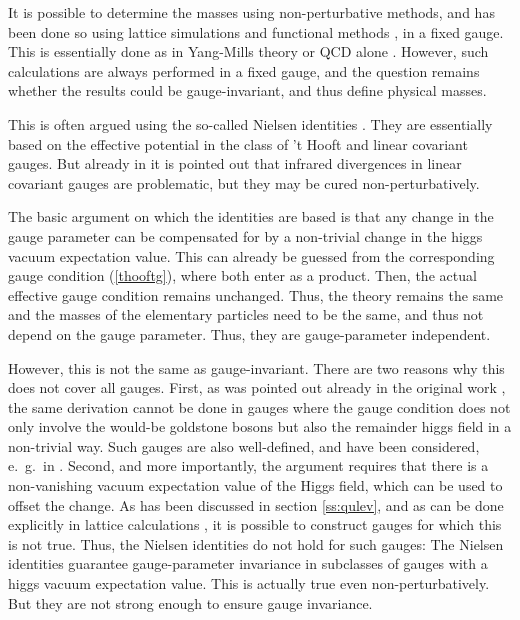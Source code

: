 \documentclass[final,12pt]{article}
\newcommand*{\pref}[1]{(\ref{#1})}
\newcommand*{\1}{1\!\!\!\bot}
\begin{document}
It is possible to determine the masses using non-perturbative methods, and has been done so using lattice simulations \cite{Karsch:1996aw,Maas:2010nc,Maas:2012tj,Maas:2013aia,Maas:2016edk,Maas:2016ngo,Maas:2018sqz} and functional methods \cite{Benes:2008ir,Fister:2010yw}, in a fixed gauge. This is essentially done as in Yang-Mills theory or QCD alone \cite{Maas:2011se}. However, such calculations are always performed in a fixed gauge, and the question remains whether the results could be gauge-invariant, and thus define physical masses.

This is often argued using the so-called Nielsen identities \cite{Nielsen:1975fs}. They are essentially based on the effective potential in the class of 't Hooft and linear covariant gauges. But already in \cite{Nielsen:1975fs} it is pointed out that infrared divergences in linear covariant gauges are problematic, but they may be cured non-perturbatively.

The basic argument on which the identities are based is that any change in the gauge parameter can be compensated for by a non-trivial change in the higgs vacuum expectation value. This can already be guessed from the corresponding gauge condition \pref{thooftg}, where both enter as a product. Then, the actual effective gauge condition remains unchanged. Thus, the theory remains the same and the masses of the elementary particles need to be the same, and thus not depend on the gauge parameter. Thus, they are gauge-parameter independent. 

However, this is not the same as gauge-invariant. There are two reasons why this does not cover all gauges. First, as was pointed out already in the original work \cite{Nielsen:1975fs}, the same derivation cannot be done in gauges where the gauge condition does not only involve the would-be goldstone bosons but also the remainder higgs field in a non-trivial way. Such gauges are also well-defined, and have been considered, e.\ g.\ in \cite{Dolan:1974gu}. Second, and more importantly, the argument requires that there is a non-vanishing vacuum expectation value of the Higgs field, which can be used to offset the change. As has been discussed in section \ref{ss:qulev}, and as can be done explicitly in lattice calculations \cite{Maas:2012ct}, it is possible to construct gauges for which this is not true. Thus, the Nielsen identities do not hold for such gauges: The Nielsen identities guarantee gauge-parameter invariance in subclasses of gauges with a higgs vacuum expectation value. This is actually true even non-perturbatively. But they are not strong enough to ensure gauge invariance.
\end{document}
